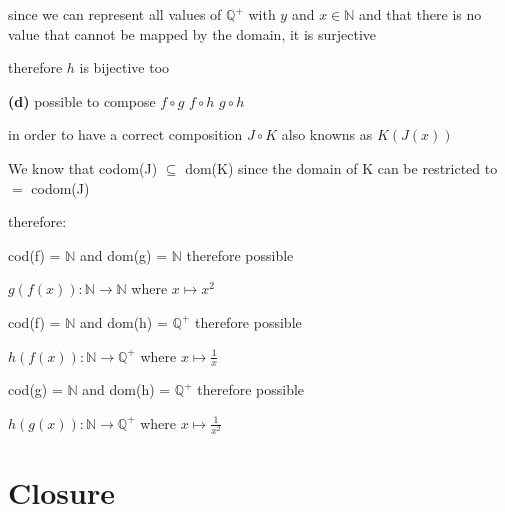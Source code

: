 \documentclass[12pts,A4]{article}
\begin{document}
\begin{flushleft}
    \bigskip
    since we can represent all values of $\mathbb{Q^{+}}$ with $y$ and $x \in \mathbb{N}$ and that there is no value that cannot be mapped by the domain, it is surjective

    \bigskip

    therefore $h$ is bijective too

    \bigskip
    \textbf{(d)} possible to compose $ f \circ g $ $ f\circ h  $ $ g \circ h$ 
     
    in order to have a correct composition $ J \circ K$ also knowns as $ K(J(x)) $

    We know that codom(J) $\subseteq$ dom(K) since the domain of K can be restricted to $=$ codom(J)

    therefore:  


    cod(f) = $\mathbb{N}$  and dom(g) = $\mathbb{N}$ therefore possible 

    $g(f(x)): \mathbb{N} \rightarrow \mathbb{N}$ where $ x \mapsto x^{2}$


    cod(f) = $\mathbb{N}$  and dom(h) = $\mathbb{Q^{+}}$ therefore possible 
    
    $h(f(x)): \mathbb{N} \rightarrow \mathbb{Q^{+}}$ where $ x \mapsto \frac{1}{x}$

    cod(g) = $\mathbb{N}$  and dom(h) = $\mathbb{Q^{+}}$ therefore possible 
    
    $h(g(x)): \mathbb{N} \rightarrow \mathbb{Q^{+}}$ where $ x \mapsto \frac{1}{x^{2}}$
\end{flushleft}

\section{Closure}
\end{document}
